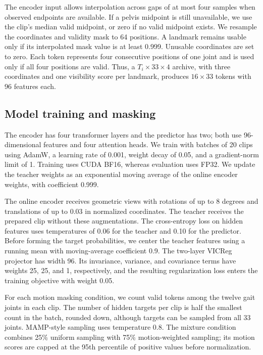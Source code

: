 \documentclass{article}
\begin{document}
The encoder input allows interpolation across gaps of at most four
samples when observed endpoints are available. If a pelvis midpoint is
still unavailable, we use the clip's median valid midpoint, or zero if
no valid midpoint exists. We resample the coordinates and validity mask
to 64 positions. A landmark remains usable only if its interpolated mask
value is at least 0.999. Unusable coordinates are set to zero. Each
token represents four consecutive positions of one joint and is used
only if all four positions are valid. Thus, a \(T_i\times33\times4\)
archive, with three coordinates and one visibility score per landmark,
produces \(16\times33\) tokens with 96 features each.

\subsection{Model training and
masking}\label{model-training-and-masking}

The encoder has four transformer layers and the predictor has two; both
use 96-dimensional features and four attention heads. We train with
batches of 20 clips using AdamW, a learning rate of 0.001, weight decay
of 0.05, and a gradient-norm limit of 1. Training uses CUDA BF16,
whereas evaluation uses FP32. We update the teacher weights as an
exponential moving average of the online encoder weights, with
coefficient 0.999.

The online encoder receives geometric views with rotations of up to 8
degrees and translations of up to 0.03 in normalized coordinates. The
teacher receives the prepared clip without these augmentations. The
cross-entropy loss on hidden features uses temperatures of 0.06 for the
teacher and 0.10 for the predictor. Before forming the target
probabilities, we center the teacher features using a running mean with
moving-average coefficient 0.9. The two-layer VICReg projector has width
96. Its invariance, variance, and covariance terms have weights 25, 25,
and 1, respectively, and the resulting regularization loss enters the
training objective with weight 0.05.

For each motion masking condition, we count valid tokens among the
twelve gait joints in each clip. The number of hidden targets per clip
is half the smallest count in the batch, rounded down, although targets
can be sampled from all 33 joints. MAMP-style sampling uses temperature
0.8. The mixture condition combines 25\% uniform sampling with 75\%
motion-weighted sampling; its motion scores are capped at the 95th
percentile of positive values before normalization.
\end{document}
